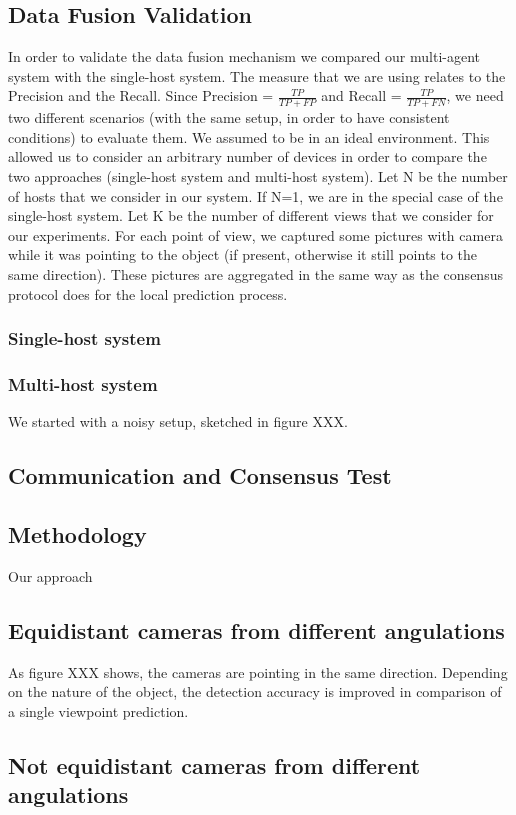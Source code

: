 \documentclass[10pt,conference,compsocconf]{IEEEtran}
\begin{document}
\subsection{Data Fusion Validation}
In order to validate the data fusion mechanism we compared our multi-agent system with the single-host system. The measure that we are using relates to the Precision and the Recall. Since Precision = $\frac{TP}{TP+FP}$ and Recall = $\frac{TP}{TP+FN}$, we need two different scenarios (with the same setup, in order to have consistent conditions) to evaluate them.
We assumed to be in an ideal environment. This allowed us to consider an arbitrary number of devices in order to compare the two approaches (single-host system and multi-host system). Let N be the number of hosts that we consider in our system. If N=1, we are in the special case of the single-host system. Let K be the number of different views that we consider for our experiments. For each point of view, we captured some pictures with camera while it was pointing to the object (if present, otherwise it still points to the same direction). These pictures are aggregated in the same way as the consensus protocol does for the local prediction process.
\subsubsection{Single-host system}
\subsubsection{Multi-host system}
We started with a noisy setup, sketched in figure XXX. 
\subsection{Communication and Consensus Test}
\subsection{Methodology}
Our approach 
\subsection{Equidistant cameras from different angulations}
As figure XXX shows, the cameras are pointing in the same direction. Depending on the nature of the object, the detection accuracy is improved in comparison of a single viewpoint prediction. 
\subsection{Not equidistant cameras from different angulations}
\end{document}
